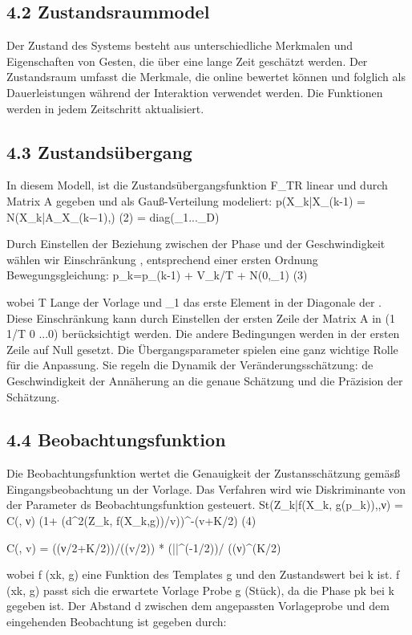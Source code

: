 \documentclass{llncs}
\begin{document}
\subsection{4.2 Zustandsraummodel}
Der Zustand des Systems besteht aus unterschiedliche Merkmalen und Eigenschaften von Gesten, die über eine lange Zeit geschätzt werden. Der Zustandsraum umfasst die Merkmale, die online bewertet können und folglich als Dauerleistungen während der Interaktion verwendet werden. Die Funktionen werden in jedem Zeitschritt aktualisiert.

\subsection{4.3 Zustandsübergang}
In diesem Modell, ist die Zustandsübergangsfunktion F_TR linear und durch Matrix A gegeben und als Gauß-Verteilung modeliert: 
p(X_k|X_(k-1) =  N(X_k|A_X_(k−1),\sum )					(2)
\sum = diag(\phi_1...\phi_D)

Durch Einstellen der Beziehung zwischen der Phase und der Geschwindigkeit wählen wir Einschränkung , entsprechend einer ersten Ordnung Bewegungsgleichung: 
p_k=p_(k-1) + V_k/T + N(0,\phi_1)						(3)

wobei T Lange der Vorlage und \phi_1 das erste Element in der Diagonale der \sum. Diese Einschränkung kann durch Einstellen der ersten Zeile der Matrix A in (1 1/T 0 ...0) berücksichtigt werden. Die andere Bedingungen werden in der ersten Zeile auf Null gesetzt.
Die Übergangsparameter spielen eine ganz wichtige Rolle für die Anpassung. Sie regeln die Dynamik  der Veränderungsschätzung: de Geschwindigkeit der Annäherung an die genaue Schätzung und die Präzision der Schätzung.

\subsection{4.4 Beobachtungsfunktion} 
Die Beobachtungsfunktion wertet die Genauigkeit der Zustansschätzung gemäsß Eingangsbeobachtung un der Vorlage. Das Verfahren wird wie Diskriminante von der Parameter ds Beobachtungsfunktion gesteuert.
St(Z_k|f(X_k, g(p_k)),\sum,ν) = C(\sum, ν) (1+ (d^2(Z_k, f(X_k,g))/v))^-(v+K/2)		(4)

C(\sum, v) =  \Gamma((ν/2+K/2))/(\Gamma(v/2)) *  (|\sum|^(-1/2))/ ((ν\pi)^(K/2)

wobei f (xk, g) eine Funktion des Templates g und den Zustandswert bei k ist.  f (xk, g) passt sich die erwartete Vorlage Probe g (Stück), da die Phase pk bei k gegeben ist. Der Abstand d zwischen dem angepassten Vorlageprobe und dem eingehenden Beobachtung ist gegeben durch:
\end{document}

